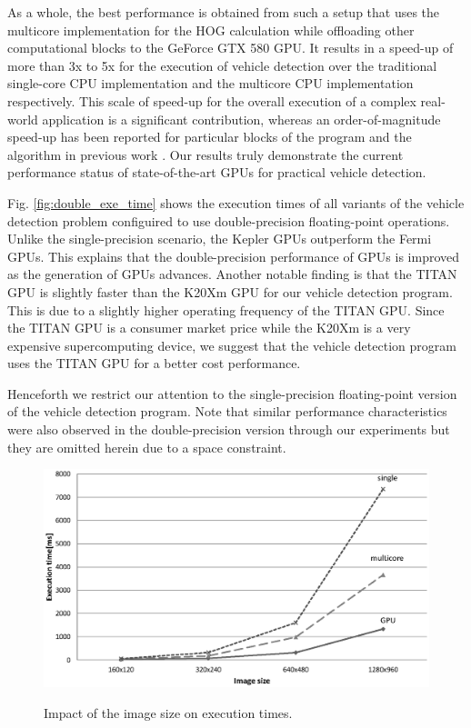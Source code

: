 As a whole, the best performance is obtained from such a setup that
uses the multicore implementation for the HOG calculation while
offloading other computational blocks to the GeForce GTX 580 GPU.
It results in a speed-up of more than 3x to 5x for the execution of
vehicle detection over the traditional single-core CPU implementation
and the multicore CPU implementation respectively.
This scale of speed-up for the overall execution of a complex real-world
application is a significant contribution, whereas an order-of-magnitude
speed-up has been reported for particular blocks of the program and the
algorithm in previous work \cite{Chen11, Prisacariu09}.
Our results truly demonstrate the current performance status of
state-of-the-art GPUs for practical vehicle detection.

Fig. \ref{fig:double_exe_time} shows the execution times of all variants
of the vehicle detection problem configuired to use double-precision
floating-point operations.
Unlike the single-precision scenario, the Kepler GPUs outperform the
Fermi GPUs.
This explains that the double-precision performance of GPUs is improved
as the generation of GPUs advances.
Another notable finding is that the TITAN GPU is slightly faster than
the K20Xm GPU for our vehicle detection program.
This is due to a slightly higher operating frequency of the TITAN GPU.
Since the TITAN GPU is a consumer market price while the K20Xm is a very
expensive supercomputing device, we suggest that the vehicle detection
program uses the TITAN GPU for a better cost performance.

Henceforth we restrict our attention to the single-precision
floating-point version of the vehicle detection program.
Note that similar performance characteristics were also observed in the
double-precision version through our experiments but they are omitted
herein due to a space constraint.

\begin{figure}[t]
 \begin{center}
  \includegraphics[width=\hsize]{fig/time_on_image_size.eps}\\
  \caption{Impact of the image size on execution times.}
  \label{fig:time_on_image_size}
 \end{center}
\end{figure}

